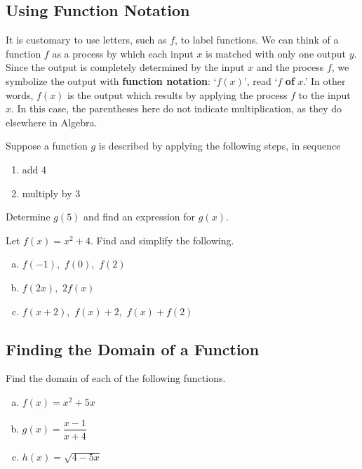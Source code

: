\documentclass[oneside,10pt]{book}
\begin{document}
\subsection{Using Function Notation}

It is customary to use letters, such as $f$, to label functions.
We can think of a function $f$ as a process
by which each input $x$ is matched with only one output $y$.
Since the output is completely determined by the input $x$ and the process $f$, we symbolize the output with \textbf{function notation}: `$f(x)$', read `$f$ \textbf{of} $x$.'
In other words, $f(x)$ is the output which results by applying the process $f$ to the input $x$.
In this case, the parentheses here do not indicate multiplication, as they do elsewhere in Algebra.


\example
Suppose a function $g$ is described by applying the following steps,
in sequence
\begin{enumerate}
  \item  add 4
  \item  multiply by 3
\end{enumerate}
Determine $g(5)$ and find an expression for $g(x)$.
\vfill


\newpage


\example
Let $f(x) = x^2 +  4$.
Find and simplify the following.
\begin{enumerate}[(a)]
  \item $f(-1)$,\ $f(0)$,\, $f(2)$
  \item  $f(2x)$,\, $2 f(x)$
  \item $f(x+2)$,\, $f(x)+2$,\, $f(x) + f(2)$
\end{enumerate}
\vfill

\newpage


\subsection{Finding the Domain of a Function}


\example
Find the domain of each of the following functions.

\begin{enumerate}[(a)]
  \item
  $f(x) = x^2 + 5x $
  \vfill
  \item
    $g(x) = \dfrac{x-1}{x+4}$
  \vfill
  \item
    $h(x) = \sqrt{4 - 5x}$
  \vfill

\end{enumerate}
\end{document}
